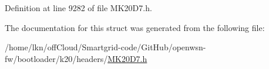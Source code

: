 Definition at line 9282 of file M\+K20\+D7.\+h.



The documentation for this struct was generated from the following file\+:\begin{DoxyCompactItemize}
\item 
/home/lkn/off\+Cloud/\+Smartgrid-\/code/\+Git\+Hub/openwsn-\/fw/bootloader/k20/headers/\hyperlink{bootloader_2k20_2headers_2_m_k20_d7_8h}{M\+K20\+D7.\+h}\end{DoxyCompactItemize}
